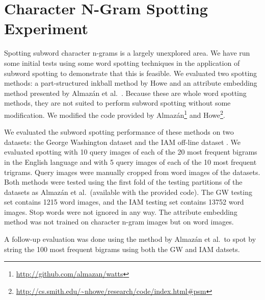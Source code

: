 \documentclass[conference]{IEEEtran}
\begin{document}
\section{Character N-Gram Spotting Experiment}
Spotting subword character n-grams is a largely unexplored area. We have run some initial tests using some word spotting techniques in the application of subword spotting to demonstrate that this is feasible. We evaluated two spotting methods: a part-structured inkball method by Howe \cite{Howe2013} and an attribute embedding method presented by Almaz\'{a}n et al.~\cite{Almazan2014}. Because these are whole word spotting methods, they are not suited to perform subword spotting without some modification. We modified the code provided by Almaz\'{a}n\footnote{\url{http://github.com/almazan/watts}} and Howe\footnote{\url{http://cs.smith.edu/~nhowe/research/code/index.html#psm}}.

We evaluated the subword spotting performance of these methods on two datasets: the George Washington dataset \cite{GW} and the IAM off-line dataset \cite{IAM}. We evaluated spotting with 10 query images of each of the 20 most frequent bigrams in the English language and with 5 query images of each of the 10 most frequent trigrams. Query images were manually cropped from word images of the datasets. 
Both methods were tested using the first fold of the testing partitions of the datasets as Almaz\'{a}n et al.~(available with the provided code).
The GW testing set contains 1215 word images, and the IAM testing set contains 13752 word images. Stop words were not ignored in any way. The attribute embedding method was not trained on character n-gram images but on word images.

A follow-up evaluation was done using the method by Almaz\'{a}n et al.~to spot by string the 100 most frequent bigrams using both the GW and IAM datsets.
\end{document}
